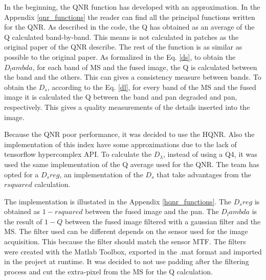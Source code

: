 \documentclass[12pt]{report}
\begin{document}
In the beginning, the QNR function has developed with an approximation. In the Appendix \ref{qnr_functions} the reader can 
find all the principal functions written for the QNR. 
As described in the code, the Q has obtained as an average of the Q calculated band-by-band.
This means is not calculated in patches as the original paper of the QNR describe.
The rest of the function is as similar as possible to the original paper.
As formalized in the Eq. \ref{ds}, to obtain the $D_lambda$, for each band of MS and the fused image, the Q is calculated between
the band and the others. This can gives a consistency measure between bands. 
To obtain the $D_s$, according to the Eq. \ref{dl}, for every band of the MS and the fused image it is calculated the Q between the band and
pan degraded and pan, respectively. This gives a quality measurements of the details inserted into the image. 

Because the QNR poor performance, it was decided to use the HQNR. Also the implementation of this index have some approximations due to the lack of tensorflow hypercomplex API.
To calculate the $D_\lambda$, instead of using a Q4, it was used the same implementation of the Q average used for the QNR.
The team has opted for a $D_sreg$, an implementation of the $D_s$ that take advantages from the $r squared$ calculation.  

The implementation is illustated in the Appendix \ref{hqnr_functions}.
The $D_sreg$ is obtained as $1 - rsquared$ between the fused image and the pan. 
The $D_lambda$ is the result of $1 - Q$ between the fused image filtered with a gaussian filter and the MS.
The filter used can be different depends on the sensor used for the image acquisition.
This because the filter should match the sensor MTF.   
The filters were created with the Matlab Toolbox, exported in the .mat format and imported in the project at runtime.
It was decided to not use padding after the filtering process and cut the extra-pixel from the MS for the Q calculation.  
\end{document}
